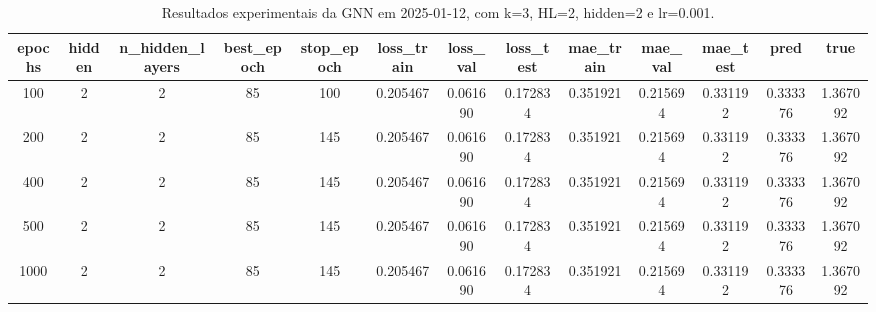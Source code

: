 \begin{table}[h]
\centering
\caption{Resultados experimentais da GNN em 2025-01-12, com k=3, HL=2, hidden=2 e lr=0.001.}
\label{tab:gnn_results_k3_hl2_h2_d20250112}
\begin{tabular}{ccccccccccccc}
\toprule
epochs & hidden & n\_hidden\_layers & best\_epoch & stop\_epoch & loss\_train & loss\_val & loss\_test & mae\_train & mae\_val & mae\_test & pred & true \\
\midrule
100 & 2 & 2 & 85 & 100 & 0.205467 & 0.061690 & 0.172834 & 0.351921 & 0.215694 & 0.331192 & 0.333376 & 1.367092 \\
200 & 2 & 2 & 85 & 145 & 0.205467 & 0.061690 & 0.172834 & 0.351921 & 0.215694 & 0.331192 & 0.333376 & 1.367092 \\
400 & 2 & 2 & 85 & 145 & 0.205467 & 0.061690 & 0.172834 & 0.351921 & 0.215694 & 0.331192 & 0.333376 & 1.367092 \\
500 & 2 & 2 & 85 & 145 & 0.205467 & 0.061690 & 0.172834 & 0.351921 & 0.215694 & 0.331192 & 0.333376 & 1.367092 \\
1000 & 2 & 2 & 85 & 145 & 0.205467 & 0.061690 & 0.172834 & 0.351921 & 0.215694 & 0.331192 & 0.333376 & 1.367092 \\
\bottomrule
\end{tabular}
\end{table}
